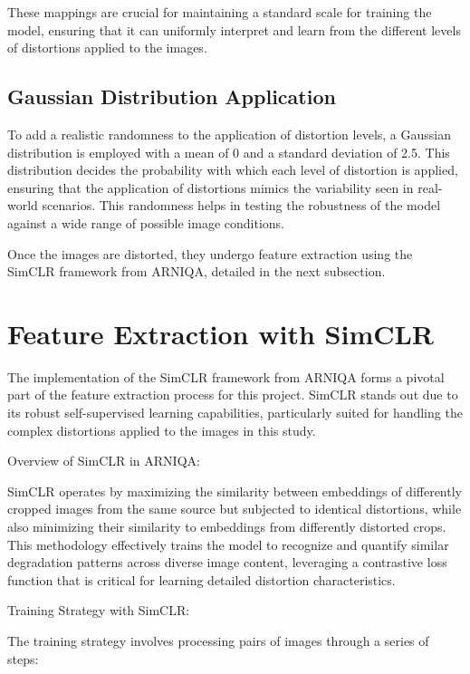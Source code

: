 \noindent
These mappings are crucial for maintaining a standard scale for training the model, ensuring that it can uniformly interpret and learn from the different levels of distortions applied to the images. \par

\subsection{Gaussian Distribution Application}
\label{sub:GaussianDist}
To add a realistic randomness to the application of distortion levels, a Gaussian distribution is employed with a mean of 0 and a standard deviation of 2.5. This distribution decides the probability with which each level of distortion is applied, ensuring that the application of distortions mimics the variability seen in real-world scenarios. This randomness helps in testing the robustness of the model against a wide range of possible image conditions. \par
\vspace{\baselineskip}
\noindent
Once the images are distorted, they undergo feature extraction using the SimCLR framework from ARNIQA, detailed in the next subsection. \par

\section{Feature Extraction with SimCLR}
\label{sec:FeatureExtraction}
The implementation of the SimCLR framework from ARNIQA forms a pivotal part of the feature extraction process for this project. SimCLR stands out due to its robust self-supervised learning capabilities, particularly suited for handling the complex distortions applied to the images in this study.

Overview of SimCLR in ARNIQA:

SimCLR operates by maximizing the similarity between embeddings of differently cropped images from the same source but subjected to identical distortions, while also minimizing their similarity to embeddings from differently distorted crops. This methodology effectively trains the model to recognize and quantify similar degradation patterns across diverse image content, leveraging a contrastive loss function that is critical for learning detailed distortion characteristics.

Training Strategy with SimCLR:

The training strategy involves processing pairs of images through a series of steps:


